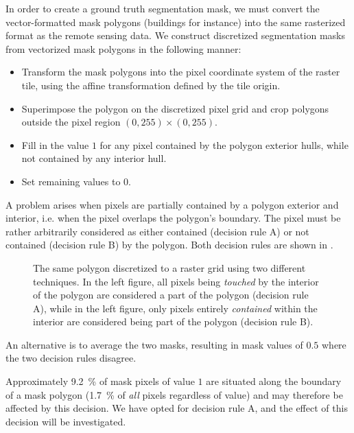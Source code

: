 In order to create a ground truth segmentation mask, we must convert the vector-formatted mask polygons (buildings for instance) into the same rasterized format as the remote sensing data.
We construct discretized segmentation masks from vectorized mask polygons in the following manner:

\begin{itemize}
  \item Transform the mask polygons into the pixel coordinate system of the raster tile, using the affine transformation defined by the tile origin.
  \item Superimpose the polygon on the discretized pixel grid and crop polygons outside the pixel region $(0, 255) \times (0, 255)$.
  \item Fill in the value $1$ for any pixel contained by the polygon exterior hulls, while not contained by any interior hull.
  \item Set remaining values to $0$.
\end{itemize}

A problem arises when pixels are partially contained by a polygon exterior and interior, i.e. when the pixel overlaps the polygon's boundary.
The pixel must be rather arbitrarily considered as either contained (decision rule A) or not contained (decision rule B) by the polygon.
Both decision rules are shown in .

\begin{figure}[H]
  \centering
  
  \hspace{2em}
  
  \caption{
    The same polygon discretized to a raster grid using two different techniques.
    In the left figure, all pixels being \textit{touched} by the interior of the polygon
    are considered a part of the polygon (decision rule A), while in the left figure, only pixels
    entirely \textit{contained} within the interior are considered being part
    of the polygon (decision rule B).
  }
  \label{fig:pixel-containment}
\end{figure}

An alternative is to average the two masks, resulting in mask values of $0.5$ where the two decision rules disagree.

Approximately \SI{9.2}{\percent} of mask pixels of value $1$ are situated along the boundary of a mask polygon (\SI{1.7}{\percent} of \textit{all} pixels regardless of value) and may therefore be affected by this decision.
We have opted for decision rule A, and the effect of this decision will be investigated.

